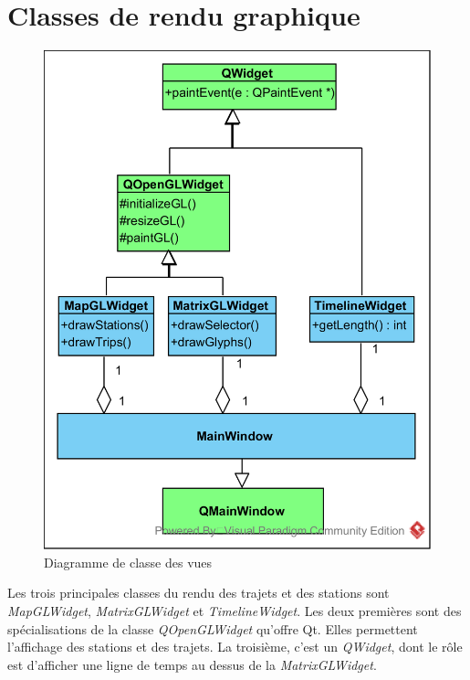 \documentclass[12pt]{article}
\begin{document}
	\newpage
	\section{Classes de rendu graphique}
	
	\begin{figure}[!h]
	\begin{center}
	\includegraphics[scale=1]{dia_class_rendering.png}
	\caption{Diagramme de classe des vues}
	\label{fig:renduGraphique}
	\end{center}
	\end{figure}
	
	Les trois principales classes du rendu des trajets et des stations sont \textit{MapGLWidget}, \textit{MatrixGLWidget} et \textit{TimelineWidget}. Les deux premières sont des spécialisations de la classe \textit{QOpenGLWidget} qu’offre Qt. Elles permettent l’affichage des stations et des trajets. La troisième, c’est un \textit{QWidget}, dont le rôle est d’afficher une ligne de temps au
dessus de la \textit{MatrixGLWidget}.
	
\end{document}
